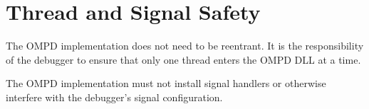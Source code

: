 \section{Thread and Signal Safety}

The OMPD implementation does not need to be reentrant. It is the responsibility 
of the debugger to ensure that only one thread enters the OMPD DLL at a time.

The OMPD implementation must not install signal handlers or otherwise
interfere with the debugger's signal configuration.